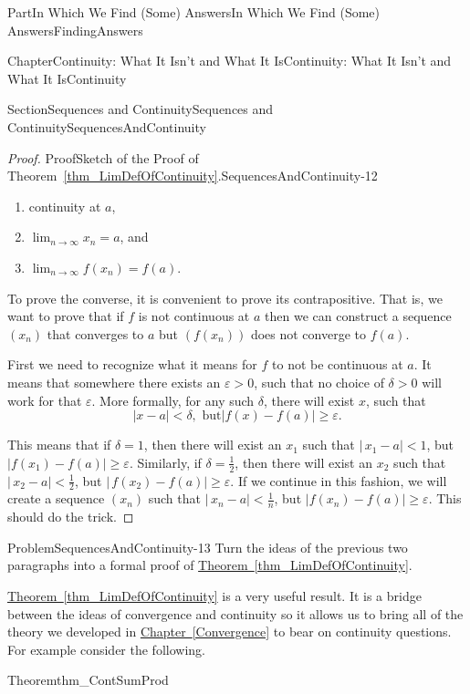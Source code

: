 \documentclass[oneside,10pt,]{book}
\newcommand{\xreffont}{\relax}
\numberwithin{equation}{part}
\newcommand{\abs}[1]{\left|#1\right|}
\def\limit#1#2#3{{\displaystyle\lim_{#1\rightarrow #2}#3}}
\newcommand{\eps}{\varepsilon}
\newcommand{\lt}{<}
\begin{document}
\begin{partptx}{Part}{In Which We Find (Some) Answers}{}{In Which We Find (Some) Answers}{}{}{FindingAnswers}
\begin{chapterptx}{Chapter}{Continuity: What It Isn't and What It Is}{}{Continuity: What It Isn't and What It Is}{}{}{Continuity}
\begin{sectionptx}{Section}{Sequences and Continuity}{}{Sequences and Continuity}{}{}{SequencesAndContinuity}
\begin{proof}{Proof}{Sketch of the Proof of Theorem~{\xreffont\ref*{thm_LimDefOfContinuity}}.}{SequencesAndContinuity-12}
\begin{enumerate}
\item{}continuity at \(a\),%
\item{}\(\limit{n}{\infty}{x_n}=a\), and%
\item{}\(\limit{n}{\infty}{f(x_n)}=f(a)\).%
\end{enumerate}
%
\par
To prove the converse, it is convenient to prove its contrapositive.  That is, we want to prove that if \(f\) is not continuous at \(a\) then we can construct a sequence \(\left(x_n\right)\) that converges to \(a\) but \(\left(f(x_n)\right)\) does not converge to \(f(a)\).%
\par
First we need to recognize what it means for \(f\) to not be continuous at \(a\).  It means that somewhere there exists an \(\eps>0\), such that no choice of \(\delta>0\) will work for that \(\eps\).  More formally, for any such \(\delta\), there will exist \(x\), such that%
\begin{equation*}
\abs{x-a}\lt \delta,\text{ but
}\abs{f(x)-f(a)}\geq\eps.
\end{equation*}
%
\par
This means that if \(\delta=1\), then there will exist an \(x_1\) such that \(|\,x_1-a|\lt 1\), but \(|f(x_1)-f(a)|\geq\eps\). Similarly, if \(\delta=\frac{1}{2}\), then there will exist an \(x_2\) such that \(|\,x_2-a|\lt \frac{1}{2}\), but \(|\,f(x_2)-f(a)|\geq\eps\).  If we continue in this fashion, we will create a sequence \(\left(x_n\right)\) such that \(|\,x_n-a|\lt \frac{1}{n}\), but \(|f(x_n)-f(a)|\geq\eps\).  This should do the trick.%
\end{proof}
\begin{problem}{Problem}{}{SequencesAndContinuity-13}%
 Turn the ideas of the previous two paragraphs into a formal proof of \hyperref[thm_LimDefOfContinuity]{Theorem~{\xreffont\ref{thm_LimDefOfContinuity}}}.%
\end{problem}
\hyperref[thm_LimDefOfContinuity]{Theorem~{\xreffont\ref{thm_LimDefOfContinuity}}} is a very useful result. It is a bridge between the ideas of convergence and continuity so it allows us to bring all of the theory we developed in \hyperref[Convergence]{Chapter~{\xreffont\ref{Convergence}}} to bear on continuity questions. For example consider the following.%
\begin{theorem}{Theorem}{}{}{thm_ContSumProd}%
%
%

\end{theorem}
\end{sectionptx}
\end{chapterptx}
\end{partptx}
\end{document}
